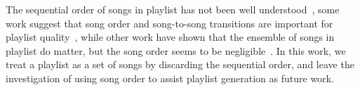 The sequential order of songs in playlist has not been well understood~\cite{schedl2017},
some work suggest that song order and song-to-song transitions are important 
for playlist quality~\cite{mcfee2012hypergraph,kamehkhosh2018automated},
while other work have shown that the ensemble of songs in playlist do matter, 
but the song order seems to be negligible~\cite{tintarev2017sequences,vall2017importance}.
In this work, we treat a playlist as a set of songs by discarding the sequential order,
and leave the investigation of using song order to assist playlist generation as future work.
